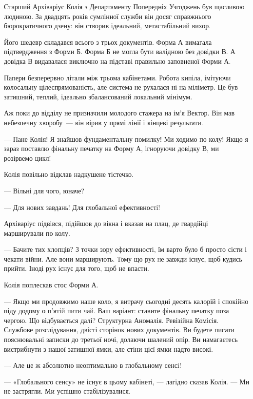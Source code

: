 \documentclass[12pt, a4paper, openany]{book}
\begin{document}
\begin{terrybox}
Старший Архіваріус Колія з Департаменту Попередніх Узгоджень був щасливою людиною. За двадцять років сумлінної служби він досяг справжнього бюрократичного дзену: він створив ідеальний, метастабільний вихор.

Його шедевр складався всього з трьох документів. Форма А вимагала підтвердження з Форми Б. Форма Б не могла бути валідною без довідки В. А довідка В видавалася виключно на підставі правильно заповненої Форми А.

Папери безперервно літали між трьома кабінетами. Робота кипіла, імітуючи колосальну цілеспрямованість, але система не рухалася ні на міліметр. Це був затишний, теплий, ідеально збалансований локальний мінімум.

Аж поки до відділу не призначили молодого стажера на ім'я Вектор. Він мав небезпечну хворобу~--- він вірив у прямі лінії і кінцеві результати.

--- Пане Колія! Я знайшов фундаментальну помилку! Ми ходимо по колу! Якщо я зараз поставлю фінальну печатку на Форму А, ігноруючи довідку В, ми розірвемо цикл!

Колія повільно відклав надкушене тістечко.

--- Вільні для чого, юначе?

--- Для нових завдань! Для глобальної ефективності!

Архіваріус підвівся, підійшов до вікна і вказав на плац, де гвардійці марширували по колу.

--- Бачите тих хлопців? З точки зору ефективності, їм варто було б просто сісти і чекати війни. Але вони марширують. Тому що рух не завжди існує, щоб кудись прийти. Іноді рух існує для того, щоб не впасти.

Колія поплескав стос Форми А.

--- Якщо ми продовжимо наше коло, я витрачу сьогодні десять калорій і спокійно піду додому о п'ятій пити чай. Ваш варіант: ставите фінальну печатку поза чергою. Що відбувається далі? Структурна Аномалія. Ревізійна Комісія. Службове розслідування, двісті сторінок нових документів. Ви будете писати пояснювальні записки до третьої ночі, долаючи шалений опір. Ви намагаєтесь вистрибнути з нашої затишної ямки, але стіни цієї ямки надто високі.

--- Але це ж абсолютно неоптимально в глобальному сенсі!

--- «Глобального сенсу» не існує в цьому кабінеті, --- лагідно сказав Колія. --- Ми не застрягли. Ми успішно стабілізувалися.


\end{terrybox}
\end{document}
